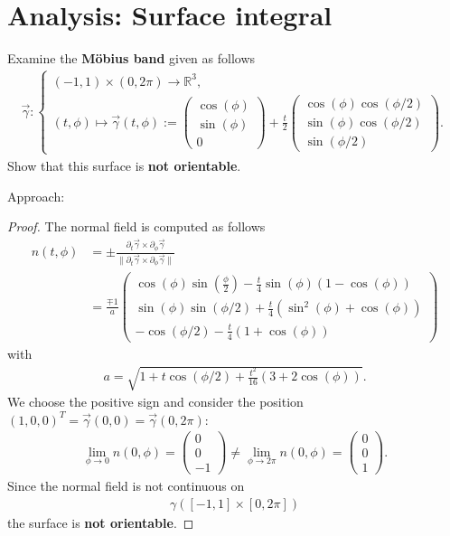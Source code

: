 \documentclass[12pt]{article}
\begin{document}
\section{Analysis: Surface integral}
\begin{exampleboxed}
	Examine the \textbf{Möbius band} given as follows
	\begin{align}
		\vec{\gamma}:
		\begin{cases}
			(-1,1) \times (0,2\pi) \to \mathbb{R}^3, \\
			(t,\phi) \mapsto 
			\vec{\gamma}(t,\phi) := 
			\begin{pmatrix} \cos(\phi) \\ \sin(\phi) \\ 0 \end{pmatrix}
			+ \frac{t}{2}
			\begin{pmatrix} \cos(\phi) \cos(\phi/2)\\ \sin(\phi) \cos(\phi/2)\\\sin(\phi/2) \end{pmatrix}.
		\end{cases}
	\end{align}
	Show that this surface is \textbf{not orientable}.
\end{exampleboxed}
Approach:
\begin{proof} 
	The normal field is computed as follows
	\begin{align*}
		n(t,\phi) 
		 & = \pm 
		\frac{\partial_t \vec{\gamma} \times \partial_{\phi} \vec{\gamma}}
		{\big\|\partial_t \vec{\gamma} \times \partial_{\phi} \vec{\gamma}\big\|} \\
		 & = \frac{\mp 1}{a}
		\begin{pmatrix}
			\cos(\phi) \sin(\frac{\phi}{2}) - \frac{t}{4} \sin(\phi)(1-\cos(\phi)) \\ 
			\sin(\phi) \sin(\phi/2) + \frac{t}{4} (\sin^2(\phi)+ \cos(\phi))       \\ 
			- \cos(\phi/2) - \frac{t}{4}(1+\cos(\phi))
		\end{pmatrix}
	\end{align*}
	with 
	\begin{align*}
		a = \sqrt{1+t \cos(\phi/2)+\frac{t^2}{16}(3+2 \cos(\phi))}.
	\end{align*}
	We choose the positive sign and consider the position 
	$(1,0,0)^T = \vec{\gamma}(0,0) = \vec{\gamma}(0,2\pi)$:
	\begin{align*}
		\lim_{\phi \to 0} n(0,\phi) 
		= \begin{pmatrix} 0\\0\\-1\end{pmatrix} \neq \lim_{\phi\to 2\pi} n(0,\phi) 
		= \begin{pmatrix} 0\\0\\1\end{pmatrix}.
	\end{align*}
	Since the normal field is not continuous on 
	\begin{align*}
		\gamma([-1,1] \times [0,2\pi])
	\end{align*}
	the surface is \textbf{not orientable}.
\end{proof}
\clearpage
\end{document}
